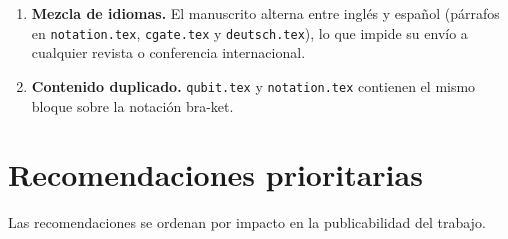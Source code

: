 \documentclass[12pt, a4paper]{article}
\begin{document}
\begin{enumerate}
  \item \textbf{Mezcla de idiomas.}
        El manuscrito alterna entre inglés y español (párrafos en
        \texttt{notation.tex}, \texttt{cgate.tex} y \texttt{deutsch.tex}),
        lo que impide su envío a cualquier revista o conferencia internacional.

  \item \textbf{Contenido duplicado.}
        \texttt{qubit.tex} y \texttt{notation.tex} contienen el mismo bloque
        sobre la notación bra-ket.
\end{enumerate}

\section{Recomendaciones prioritarias}

Las recomendaciones se ordenan por impacto en la publicabilidad del trabajo.
\end{document}
